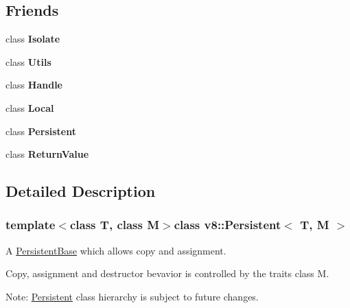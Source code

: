 \subsection*{Friends}
\begin{DoxyCompactItemize}
\item 
\hypertarget{classv8_1_1Persistent_aba4f0964bdacf2bbf62cf876e5d28d0a}{class {\bfseries Isolate}}\label{classv8_1_1Persistent_aba4f0964bdacf2bbf62cf876e5d28d0a}

\item 
\hypertarget{classv8_1_1Persistent_abc0f7da619e9e72510dc07ed7b5ff6d8}{class {\bfseries Utils}}\label{classv8_1_1Persistent_abc0f7da619e9e72510dc07ed7b5ff6d8}

\item 
\hypertarget{classv8_1_1Persistent_a9470c7f2c90465ee28ee0cd19af986ea}{class {\bfseries Handle}}\label{classv8_1_1Persistent_a9470c7f2c90465ee28ee0cd19af986ea}

\item 
\hypertarget{classv8_1_1Persistent_a0320da7f4056d4493dc1f8e49985d06e}{class {\bfseries Local}}\label{classv8_1_1Persistent_a0320da7f4056d4493dc1f8e49985d06e}

\item 
\hypertarget{classv8_1_1Persistent_a3f9b9166ff006dd19d2335aaf93aa937}{class {\bfseries Persistent}}\label{classv8_1_1Persistent_a3f9b9166ff006dd19d2335aaf93aa937}

\item 
\hypertarget{classv8_1_1Persistent_a861f1dd807b9cd4f8fd191af3071cf58}{class {\bfseries Return\-Value}}\label{classv8_1_1Persistent_a861f1dd807b9cd4f8fd191af3071cf58}

\end{DoxyCompactItemize}


\subsection{Detailed Description}
\subsubsection*{template$<$class T, class M$>$class v8\-::\-Persistent$<$ T, M $>$}

A \hyperlink{classv8_1_1PersistentBase}{Persistent\-Base} which allows copy and assignment.

Copy, assignment and destructor bevavior is controlled by the traits class M.

Note\-: \hyperlink{classv8_1_1Persistent}{Persistent} class hierarchy is subject to future changes. 

